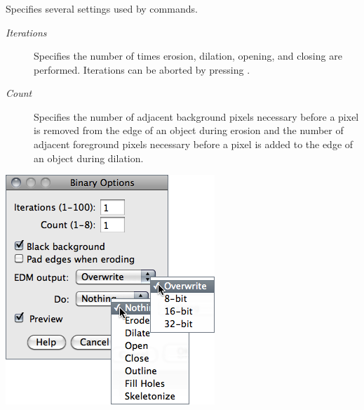 

\subsubsection[\protect\userinterface{Options\ldots{}}]{\protect{}\label{sub:BinaryOptions...}}

Specifies several settings used by 
commands.
\begin{description}
\item [{\emph{Iterations}}] Specifies the number of times erosion, dilation,
opening, and closing are performed. Iterations can be aborted by pressing
.
\item [{\emph{Count}}] Specifies the number of adjacent background pixels
necessary before a pixel is removed from the edge of an object during
erosion and the number of adjacent foreground pixels necessary before
a pixel is added to the edge of an object during dilation.
\end{description}
\begin{minipage}[c][1\totalheight][t]{0.42\columnwidth}%
\includegraphics[scale=0.55]{images/BinaryOptions}%
\end{minipage}%
